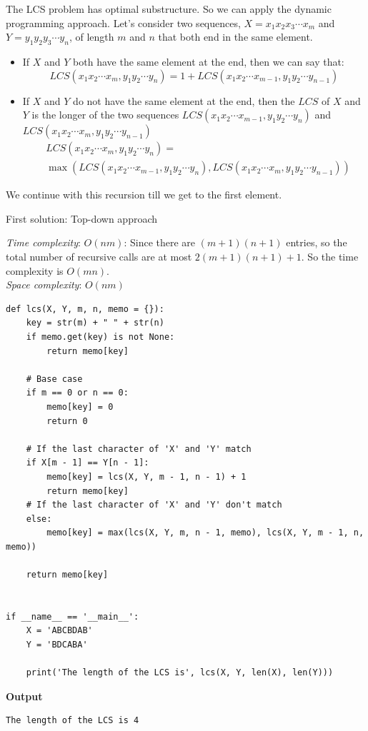 \documentclass[a4paper,11pt]{book}
\begin{document}
\noindent The LCS problem has optimal substructure. So we can apply the dynamic programming approach. Let's consider two sequences, $X = x_1x_2x_3\cdots x_m$ and $Y=y_1y_2y_3\cdots y_n$, of length $m$ and $n$ that both end in the same element.

\begin{itemize}
    \item If $X$ and $Y$ both have the same element at the end, then we can say that:
    $$LCS(x_1x_2\cdots x_m, y_1y_2\cdots y_n) = 1 + LCS(x_1x_2\cdots x_{m-1}, y_1y_2\cdots y_{n-1})$$
    \item If $X$ and $Y$ do not have the same element at the end, then the $LCS$ of $X$ and $Y$ is the longer of the two sequences $LCS(x_1x_2\cdots x_{m-1}, y_1y_2\cdots y_n)$ and $LCS(x_1x_2\cdots x_m, y_1y_2\cdots y_{n-1})$
    \begin{align*}
        &LCS(x_1x_2\cdots x_m, y_1y_2\cdots y_n) =\\
        &\max(LCS(x_1x_2\cdots x_{m-1}, y_1y_2\cdots y_n), LCS(x_1x_2\cdots x_m, y_1y_2\cdots y_{n-1}))
    \end{align*}
\end{itemize}

\noindent We continue with this recursion till we get to the first element.
\vspace{3mm}

\noindent First solution: Top-down approach

\noindent \textit{Time complexity}: $O(nm)$: Since there are $(m+1)(n+1)$ entries, so the total number of recursive calls are at most $2(m+1)(n+1)+1$. So the time complexity is $O(mn)$.\\
\noindent  \textit{Space complexity}: $O(nm)$

\begin{lstlisting}
def lcs(X, Y, m, n, memo = {}):
    key = str(m) + " " + str(n)
    if memo.get(key) is not None:
        return memo[key]

    # Base case
    if m == 0 or n == 0:
        memo[key] = 0
        return 0
 
    # If the last character of 'X' and 'Y' match
    if X[m - 1] == Y[n - 1]:
        memo[key] = lcs(X, Y, m - 1, n - 1) + 1
        return memo[key]
    # If the last character of 'X' and 'Y' don't match
    else:
        memo[key] = max(lcs(X, Y, m, n - 1, memo), lcs(X, Y, m - 1, n, memo))
    
    return memo[key]
 
 
if __name__ == '__main__':
    X = 'ABCBDAB'
    Y = 'BDCABA'
 
    print('The length of the LCS is', lcs(X, Y, len(X), len(Y)))
\end{lstlisting}
\textbf{Output}
\begin{lstlisting}
The length of the LCS is 4
\end{lstlisting}
\end{document}

